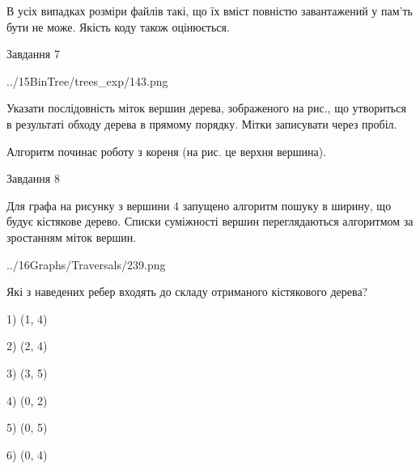 \documentclass[12pt, ukrainian]{article}
\begin{document}
{В усіх випадках розміри файлів такі, що їх вміст повністю завантажений у пам'ть бути не може. Якість коду також оцінюється.



\vspace{10mm}\par

\newpage
\begin{minipage}[t]{9.7cm}
               
{\begin{center}Завдання {7}\end{center}}
\vspace{-4mm}

\begin{center}
	{../15BinTree/trees_exp/143.png}
\end{center}
Указати послідовність міток вершин дерева, зображеного на рис., що утвориться в результаті обходу дерева в прямому порядку. Мітки записувати через пробіл.\par Алгоритм починає роботу з кореня (на рис. це верхня вершина).\par

\end{minipage}
\vline \hspace{8mm}
\begin{minipage}[t]{8.0cm}
               
{\begin{center}Завдання {8}\end{center}}
\vspace{-4mm}
Для графа на рисунку з вершини 4 запущено алгоритм пошуку в ширину, що будує кістякове дерево. Списки суміжності вершин переглядаються алгоритмом за зростанням міток вершин.\par
\begin{center}
	{../16Graphs/Traversals/239.png}
\end{center}
\par Які з наведених ребер входять до складу отриманого кістякового дерева?\par
1) (1, 4)\par
2) (2, 4)\par
3) (3, 5)\par
4) (0, 2)\par
5) (0, 5)\par
6) (0, 4)\par
{\vskip 15pt} \par


\end{minipage}}
\end{document}
